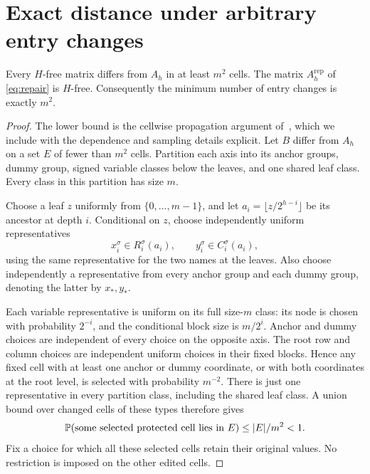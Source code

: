 \section{Exact distance under arbitrary entry changes}
\label{sec:distance}

\begin{theorem}
\label{thm:repair}
Every \(H\)-free matrix differs from \(A_h\) in at least \(m^2\) cells.
The matrix \(A_h^{\mathrm{rep}}\) of \eqref{eq:repair} is \(H\)-free.
Consequently the minimum number of entry changes is exactly \(m^2\).
\end{theorem}
\begin{proof}
The lower bound is the cellwise propagation argument of~\cite{OAI190},
which we include with the dependence and sampling details explicit.
Let \(B\) differ from \(A_h\) on a set \(E\) of fewer than \(m^2\)
cells. Partition each axis into its anchor groups, dummy group, signed
variable classes below the leaves, and one shared leaf class. Every
class in this partition has size \(m\).

Choose a leaf \(z\) uniformly from \(\{0,\ldots,m-1\}\), and let
\(a_i=\lfloor z/2^{h-i}\rfloor\) be its ancestor at depth \(i\).
Conditional on \(z\), choose independently uniform representatives
\[
 x_i^\sigma\in R_i^\sigma(a_i),\qquad
 y_i^\sigma\in C_i^\sigma(a_i),
\]
using the same representative for the two names at the leaves. Also
choose independently a representative from every anchor group and
each dummy group, denoting the latter by \(x_*,y_*\).

Each variable representative is uniform on its full size-\(m\) class:
its node is chosen with probability \(2^{-i}\), and the conditional
block size is \(m/2^i\). Anchor and dummy choices are independent of
every choice on the opposite axis. The root row and column choices
are independent uniform choices in their fixed blocks. Hence any fixed
cell with at least one anchor or dummy coordinate, or with both
coordinates at the root level, is selected with probability \(m^{-2}\).
There is just one representative in every partition class, including
the shared leaf class. A union bound over changed cells of these types
therefore gives
\begin{equation}
 \mathbb P(\text{some selected protected cell lies in }E)
 \le |E|/m^2<1.
 \label{eq:protected}
\end{equation}
Fix a choice for which all these selected cells retain their original
values. No restriction is imposed on the other edited cells.


\end{proof}
